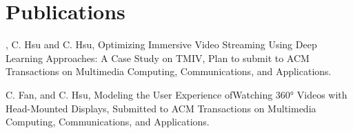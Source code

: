 
\section{Publications}


\begin{thebibliography}{5}

, C. Hsu and C. Hsu,
\newblock Optimizing Immersive Video Streaming Using Deep Learning Approaches: A Case Study on TMIV,
\newblock Plan to submit to ACM Transactions on Multimedia Computing, Communications, and Applications.

 C. Fan,  and C. Hsu,
\newblock Modeling the User Experience ofWatching 360° Videos with Head-Mounted Displays,
\newblock Submitted to ACM Transactions on Multimedia Computing, Communications, and Applications.



\end{thebibliography}


